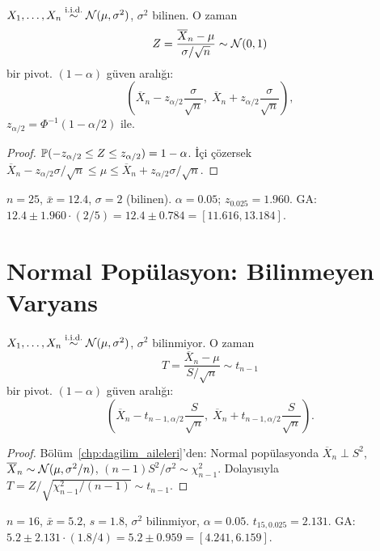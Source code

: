 \begin{teorem}\label{thm:z_ga}
$X_1,\ldots,X_n\overset{\text{i.i.d.}}{\sim}\mathcal{N}(\mu,\sigma^2)$, $\sigma^2$ bilinen. O zaman
\[
  Z = \frac{\overline{X}_n-\mu}{\sigma/\sqrt{n}} \sim \mathcal{N}(0,1)
\]
bir pivot. $(1-\alpha)$ güven aralığı:
\[
  \left(\overline{X}_n - z_{\alpha/2}\frac{\sigma}{\sqrt{n}},\; \overline{X}_n + z_{\alpha/2}\frac{\sigma}{\sqrt{n}}\right),
\]
$z_{\alpha/2} = \Phi^{-1}(1-\alpha/2)$ ile.
\end{teorem}

\begin{proof}
$\mathbb{P}(-z_{\alpha/2}\leq Z\leq z_{\alpha/2})=1-\alpha$. İçi çözersek $\overline{X}_n - z_{\alpha/2}\sigma/\sqrt{n}\leq\mu\leq\overline{X}_n+z_{\alpha/2}\sigma/\sqrt{n}$.
\end{proof}

\begin{ornek}[$z$-aralığı]\label{ex:z_aralik}
$n=25$, $\bar{x}=12.4$, $\sigma=2$ (bilinen). $\alpha=0.05$; $z_{0.025}=1.960$. GA: $12.4\pm1.960\cdot(2/5) = 12.4\pm0.784 = [11.616, 13.184]$.
\end{ornek}

\section{Normal Popülasyon: Bilinmeyen Varyans}
\label{sec:normal_bilinmeyen}

\begin{teorem}\label{thm:t_ga}
$X_1,\ldots,X_n\overset{\text{i.i.d.}}{\sim}\mathcal{N}(\mu,\sigma^2)$, $\sigma^2$ bilinmiyor. O zaman
\[
  T = \frac{\overline{X}_n-\mu}{S/\sqrt{n}} \sim t_{n-1}
\]
bir pivot. $(1-\alpha)$ güven aralığı:
\[
  \left(\overline{X}_n - t_{n-1,\alpha/2}\frac{S}{\sqrt{n}},\; \overline{X}_n + t_{n-1,\alpha/2}\frac{S}{\sqrt{n}}\right).
\]
\end{teorem}

\begin{proof}
Bölüm~\ref{chp:dagilim_aileleri}'den: Normal popülasyonda $\overline{X}_n\perp S^2$, $\overline{X}_n\sim\mathcal{N}(\mu,\sigma^2/n)$, $(n-1)S^2/\sigma^2\sim\chi^2_{n-1}$. Dolayısıyla $T = Z/\sqrt{\chi^2_{n-1}/(n-1)}\sim t_{n-1}$.
\end{proof}

\begin{ornek}[$t$-aralığı]\label{ex:t_aralik}
$n=16$, $\bar{x}=5.2$, $s=1.8$, $\sigma^2$ bilinmiyor, $\alpha=0.05$. $t_{15,0.025}=2.131$. GA: $5.2\pm2.131\cdot(1.8/4) = 5.2\pm0.959 = [4.241, 6.159]$.
\end{ornek}

